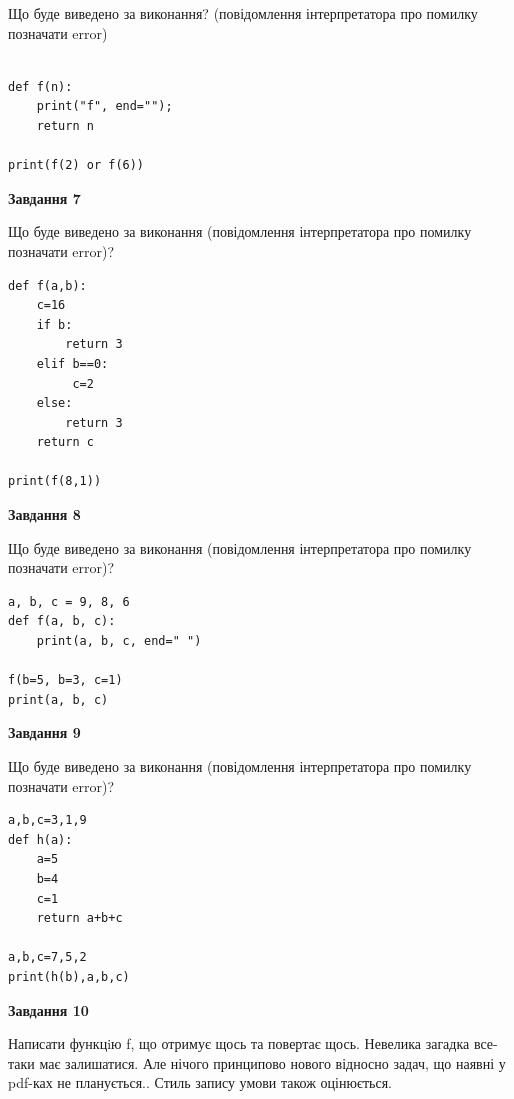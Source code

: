 \documentclass[12pt, ukrainian]{article}
\begin{document}
{\begin {large}
Що буде виведено за виконання? (повідомлення інтерпретатора про помилку позначати error)\par
\begin{verbatim}

def f(n):
    print("f", end="");
    return n

print(f(2) or f(6))
\end{verbatim}

{\begin {center}\textbf{Завдання 7}\end {center}}

Що буде виведено за виконання (повідомлення інтерпретатора про помилку позначати error)?\par
\begin{verbatim}
def f(a,b):
    c=16
    if b:
        return 3
    elif b==0:
         c=2
    else: 
        return 3
    return c

print(f(8,1))
\end{verbatim}

{\begin {center}\textbf{Завдання 8}\end {center}}

Що буде виведено за виконання (повідомлення інтерпретатора про помилку позначати error)?\par
\begin{verbatim}
a, b, c = 9, 8, 6
def f(a, b, c):
    print(a, b, c, end=" ")

f(b=5, b=3, c=1)
print(a, b, c)
\end{verbatim}

{\begin {center}\textbf{Завдання 9}\end {center}}

Що буде виведено за виконання (повідомлення інтерпретатора про помилку позначати error)?\par
\begin{verbatim}
a,b,c=3,1,9
def h(a):
    a=5
    b=4
    c=1
    return a+b+c

a,b,c=7,5,2
print(h(b),a,b,c)
\end{verbatim}

{\begin {center}\textbf{Завдання 10}\end {center}}


Написати функцiю f, що отримує щось та повертає щось. Невелика загадка все-таки має залишатися. Але нічого принципово нового відносно задач, що наявні у pdf-ках не планується.. Стиль запису умови також оцінюється.\par
\end {large}}
\newpage
\end{document}
